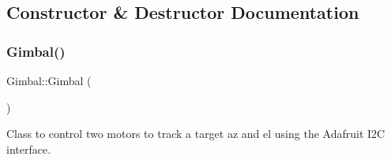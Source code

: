 \subsection{Constructor \& Destructor Documentation}
\mbox{\label{class_gimbal_a5e932498d088171ef32a3b6e2bc03cfc}} 
\subsubsection{\texorpdfstring{Gimbal()}{Gimbal()}}
{\footnotesize\ttfamily Gimbal\+::\+Gimbal (\begin{DoxyParamCaption}{ }\end{DoxyParamCaption})}



Class to control two motors to track a target az and el using the Adafruit I2C interface. 

